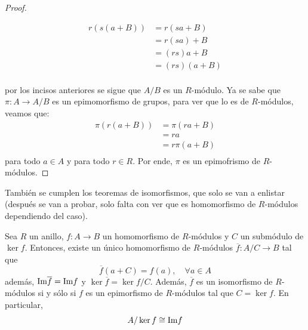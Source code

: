 \documentclass[12pt]{report}
\newcounter{it}
\theoremstyle{largebreak}
\newcommand\cf[3]{\ensuremath{#1:#2\rightarrow#3}}
\newcommand{\im}{\ensuremath{\textup{Im}}}
\begin{document}
\begin{proof}
\begin{enumerate}[label = \textit{(\alph*)}]
\begin{equation*}
                \begin{split}
                    r\left(s\left(a+B\right)\right)&=r\left(sa+B \right)\\
                    &=r(sa)+B\\
                    &=(rs)a+B\\
                    &=(rs)(a+B)\\
                \end{split}
            \end{equation*}
        \end{enumerate}
        por los incisos anteriores se sigue que $A/B$ es un $R$-módulo. Ya se sabe que $\cf{\pi}{A}{A/B}$ es un epimomorfismo de grupos, para ver que lo es de $R$-módulos, veamos que:
        \begin{equation*}
            \begin{split}
                \pi\left(r\left(a+B\right)\right)&=\pi\left(ra+B\right)\\
                &=ra\\
                &=r\pi\left(a+B \right)\\
            \end{split}
        \end{equation*}
        para todo $a\in A$ y para todo $r\in R$. Por ende, $\pi$ es un epimofrismo de $R$-módulos.
    \end{proof}

    También se cumplen los teoremas de isomorfismos, que solo se van a enlistar (después se van a probar, solo falta con ver que es homomorfismo de $R$-módulos dependiendo del caso).

    \begin{theor}
        Sea $R$ un anillo, $\cf{f}{A}{B}$ un homomorfismo de $R$-módulos y $C$ un submódulo de $\ker f$. Entonces, existe un único homomorfismo de $R$-módulos $\cf{\overline{f}}{A/C}{B}$ tal que
        \begin{equation*}
            \overline{f}(a+C)=f(a),\quad\forall a\in A
        \end{equation*}
        además, $\im\overline{f}=\im f$ y $\ker\overline{f}=\ker f/C$. Además, $\overline{f}$ es un isomorfismo de $R$-módulos si y sólo si $f$ es un epimorfismo de $R$-módulos tal que $C=\ker f$. En particular,
        \begin{equation*}
            A/\ker f\cong\im f
        \end{equation*}
    \end{theor}
\end{document}
